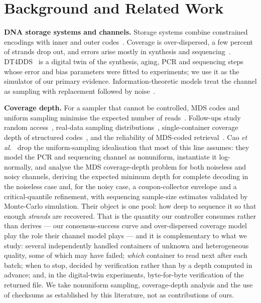 \documentclass[conference,onecolumn,11pt]{IEEEtran}
\begin{document}
\section{Background and Related Work}\label{sec:related}
\textbf{DNA storage systems and channels.}  Storage systems combine constrained encodings with
inner and outer codes~\cite{antkowiak2020low,goldman2013towards,grass2015robust,erlich2017fountain,organick2018random,press2020hedges}.
Coverage is over-dispersed, a few percent of strands drop out, and errors arise mostly in
synthesis and sequencing~\cite{heckel2019characterization,chen2020quantifying,gimpel2023digital}.
DT4DDS~\cite{gimpel2023digital} is a digital twin of the synthesis, aging, PCR and sequencing
steps whose error and bias parameters were fitted to experiments; we use it as the simulator of
our primary evidence.  Information-theoretic models treat the channel as sampling with
replacement followed by noise~\cite{shomorony2021dna,weinberger2022dna,lenz2020coding}.

\textbf{Coverage depth.}  For a sampler that cannot be controlled, MDS codes and uniform
sampling minimise the expected number of reads~\cite{barlev2025cover}.  Follow-ups study random
access~\cite{gruica2024combinatorial}, real-data sampling distributions~\cite{cao2025optimizing},
single-container coverage depth of structured codes~\cite{bertuzzo2025coverage}, and the
reliability of MDS-coded retrieval~\cite{kashanna2026reliability}.  Cao
\emph{et al.}~\cite{cao2026modeling} drop the uniform-sampling idealisation that most of this line
assumes: they model the PCR and sequencing channel as nonuniform, instantiate it log-normally, and
analyse the MDS coverage-depth problem for both noiseless and noisy channels, deriving the expected
minimum depth for complete decoding in the noiseless case and, for the noisy case, a
coupon-collector envelope and a critical-quantile refinement, with sequencing sample-size estimates
validated by Monte-Carlo simulation.  Their object is one pool: how deep to sequence it so that enough
\emph{strands} are recovered.  That is the quantity our controller consumes rather than derives --- our
consensus-success curve and over-dispersed coverage model play the role their channel model plays --- and
it is complementary to what we study: several independently handled containers of unknown and
heterogeneous quality, some of which may have failed; \emph{which} container to read next after each
batch; when to stop, decided by verification rather than by a depth computed in advance; and, in the
digital-twin experiments, byte-for-byte verification of the returned file.  We take nonuniform sampling,
coverage-depth analysis and the use of checksums as established by this literature, not as contributions
of ours.
\end{document}
